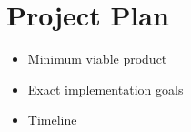 \chapter{Project Plan}

\begin{itemize}
	\item Minimum viable product
	\item Exact implementation goals
	\item Timeline
\end{itemize}